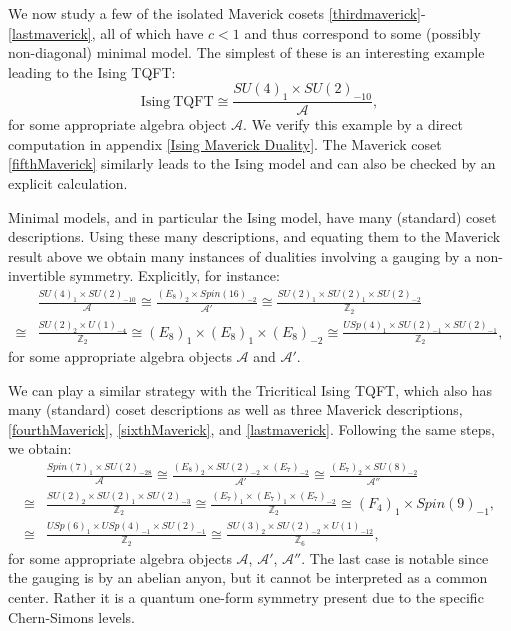 \documentclass[11pt]{article}
\numberwithin{equation}{section}
\begin{document}
We now study a few of the isolated Maverick cosets \eqref{thirdmaverick}-\eqref{lastmaverick}, all of which have $c<1$ and thus correspond to some (possibly non-diagonal) minimal model. The simplest of these is an interesting example leading to the Ising TQFT:
\begin{equation}
    \mathrm{Ising \ TQFT} \cong \frac{SU(4)_{1} \times SU(2)_{-10}}{\mathcal{A}},
\end{equation}
for some appropriate algebra object $\mathcal{A}$. We verify this example by a direct computation in appendix \ref{Ising Maverick Duality}. The Maverick coset \eqref{fifthMaverick} similarly leads to the Ising model and can also be checked by an explicit calculation. 

Minimal models, and in particular the Ising model, have many (standard) coset descriptions. Using these many descriptions, and equating them to the Maverick result above we obtain many instances of dualities involving a gauging by a non-invertible symmetry. Explicitly, for instance:
\begin{align}
    & \frac{SU(4)_{1} \times SU(2)_{-10}}{\mathcal{A}} \cong \frac{(E_{8})_{2} \times Spin(16)_{-2}}{\mathcal{A}'} \cong \frac{SU(2)_{1} \times SU(2)_{1} \times SU(2)_{-2}}{\mathbb{Z}_{2}} \nonumber \\[0.4cm]
    \cong & \frac{SU(2)_{2} \times U(1)_{-4}}{\mathbb{Z}_{2}} \cong (E_{8})_{1} \times (E_{8})_{1} \times (E_{8})_{-2} \cong \frac{USp(4)_{1} \times SU(2)_{-1} \times SU(2)_{-1}}{\mathbb{Z}_{2}},
\end{align}
for some appropriate algebra objects $\mathcal{A}$ and $\mathcal{A}'$.

We can play a similar strategy with the Tricritical Ising TQFT, which also has many (standard) coset descriptions as well as three Maverick descriptions, \eqref{fourthMaverick}, \eqref{sixthMaverick}, and \eqref{lastmaverick}. Following the same steps, we obtain:
\begin{align}
    & \frac{Spin(7)_{1} \times SU(2)_{-28}}{\mathcal{A}} \cong \frac{(E_{8})_{2} \times SU(2)_{-2} \times (E_{7})_{-2}}{\mathcal{A}'} \cong \frac{(E_{7})_{2} \times SU(8)_{-2}}{\mathcal{A}''} \nonumber \\[0.4cm]
    \cong & \frac{SU(2)_{2} \times SU(2)_{1} \times SU(2)_{-3}}{\mathbb{Z}_{2}} \cong \frac{(E_{7})_{1} \times (E_{7})_{1} \times (E_{7})_{-2}}{\mathbb{Z}_{2}} \cong (F_{4})_{1} \times Spin(9)_{-1} , \nonumber \\[0.4cm] 
    \cong & \frac{USp(6)_{1} \times USp(4)_{-1} \times SU(2)_{-1}}{\mathbb{Z}_{2}} \cong \frac{SU(3)_{2} \times SU(2)_{-2} \times U(1)_{-12}}{\mathbb{Z}_{6}},
\end{align}
for some appropriate algebra objects $\mathcal{A}$, $\mathcal{A}'$, $\mathcal{A}''$. The last case is notable since the gauging is by an abelian anyon, but it cannot be interpreted as a common center. Rather it is a quantum one-form symmetry present due to the specific Chern-Simons levels.
\end{document}
